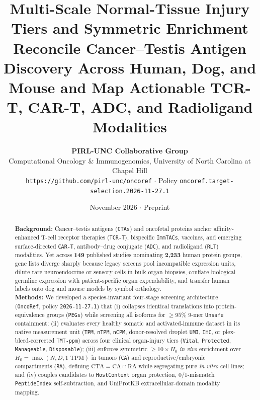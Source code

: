 \documentclass[10pt,letterpaper]{article}
\title{\textbf{\Large Multi-Scale Normal-Tissue Injury Tiers and Symmetric Enrichment Reconcile Cancer--Testis Antigen Discovery Across Human, Dog, and Mouse and Map Actionable TCR-T, CAR-T, ADC, and Radioligand Modalities}}
\author{\textbf{PIRL-UNC Collaborative Group}\\ \small Computational Oncology \& Immunogenomics, University of North Carolina at Chapel Hill \\ \footnotesize \texttt{https://github.com/pirl-unc/oncoref} $\cdot$ Policy \texttt{oncoref.target-selection.2026-11-27.1}}
\date{November 2026 $\cdot$ Preprint}
\begin{document}
\maketitle
\begin{abstract}
\noindent \textbf{Background:} Cancer--testis antigens (\texttt{CTAs}) and oncofetal proteins anchor affinity-enhanced T-cell receptor therapies (\texttt{TCR-T}), bispecific \texttt{ImmTACs}, vaccines, and emerging surface-directed \texttt{CAR-T}, antibody--drug conjugate (\texttt{ADC}), and radioligand (\texttt{RLT}) modalities. Yet across \textbf{149} published studies nominating \textbf{2,233} human protein groups, gene lists diverge sharply because legacy screens pool incompatible expression units, dilute rare neuroendocrine or sensory cells in bulk organ biopsies, conflate biological germline expression with patient-specific organ expendability, and transfer human labels onto dog and mouse models by symbol orthology.\\[0.3em]
\textbf{Methods:} We developed a species-invariant four-stage screening architecture (\texttt{OncoRef}, policy \texttt{2026-11-27.1}) that (i) collapses identical translations into protein-equivalence groups (\texttt{PEGs}) while screening all isoforms for $\ge 95\%$ 9-mer \texttt{Unsafe} containment; (ii) evaluates every healthy somatic and activated-immune dataset in its native measurement unit (\texttt{TPM}, \texttt{nTPM}, \texttt{nCPM}, donor-resolved droplet \texttt{UMI}, \texttt{IHC}, or plex-bleed-corrected \texttt{TMT-ppm}) across four clinical organ-injury tiers (\texttt{Vital}, \texttt{Protected}, \texttt{Manageable}, \texttt{Disposable}); (iii) enforces symmetric $\ge 10 \times H_0$ \emph{in vivo} enrichment over $H_0 = \max(N, D, 1\text{ TPM})$ in tumors (\texttt{CA}) and reproductive/embryonic compartments (\texttt{RA}), defining $\text{CTA} = \text{CA} \cap \text{RA}$ while segregating pure \emph{in vitro} cell lines; and (iv) couples candidates to \texttt{HostContext} organ protection, 0/1-mismatch \texttt{PeptideIndex} self-subtraction, and UniProtKB extracellular-domain modality mapping.\\[0.3em]

\end{abstract}
\end{document}
